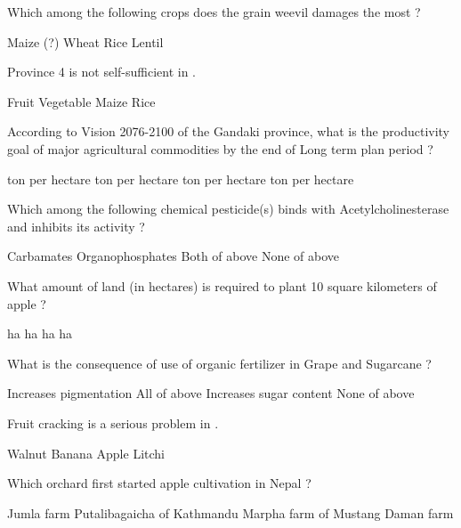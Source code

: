 \begin{questions}
\question Which among the following crops does the grain weevil damages the most ?
\begin{choices}
\CorrectChoice Maize (?)
\choice Wheat
\choice Rice
\choice Lentil
\end{choices}

\question Province 4 is not self-sufficient in \fillin[][3cm].
\begin{choices}
\choice Fruit
\choice Vegetable
\choice Maize
\CorrectChoice Rice
\end{choices}

\question According to Vision 2076-2100 of the Gandaki province, what is the productivity goal of major agricultural commodities by the end of Long term plan period ?
\begin{choices}
 ton per hectare
 ton per hectare
 ton per hectare
 ton per hectare
\end{choices}

\question Which among the following chemical pesticide(s) binds with Acetylcholinesterase and inhibits its activity ?
\begin{choices}
\choice Carbamates
\choice Organophosphates
\CorrectChoice Both of above
\choice None of above
\end{choices}

\question What amount of land (in hectares) is required to plant 10 square kilometers of apple ?
\begin{choices}
 ha
 ha
 ha
 ha
\end{choices}

\question What is the consequence of use of organic fertilizer in Grape and Sugarcane ?
\begin{choices}
\choice Increases pigmentation
\choice All of above
\CorrectChoice Increases sugar content
\choice None of above
\end{choices}

\question Fruit cracking is a serious problem in \fillin[][3cm].
\begin{choices}
\choice Walnut
\choice Banana
\choice Apple
\CorrectChoice Litchi
\end{choices}

\question Which orchard first started apple cultivation in Nepal ?
\begin{choices}
\choice Jumla farm
\CorrectChoice Putalibagaicha of Kathmandu
\choice Marpha farm of Mustang
\choice Daman farm
\end{choices}


\end{questions}
